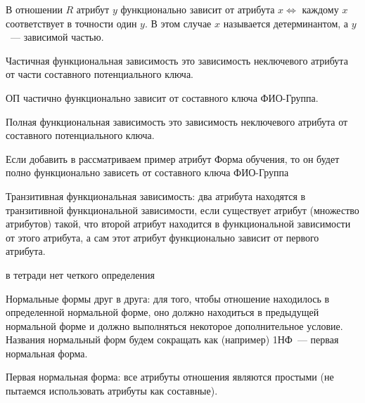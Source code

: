\begin{definition}
  В отношении \(R\) атрибут \(y\) функционально зависит от атрибута \(x \iff\)
  каждому \(x\) соответствует в точности один \(y\). В этом случае \(x\)
  называется детерминантом, а \(y\)~--- зависимой частью.
\end{definition}

\begin{definition}
  Частичная функциональная зависимость это зависимость неключевого атрибута от
  части составного потенциального ключа.
\end{definition}

\begin{example}
  ОП частично функционально зависит от составного ключа ФИО-Группа.
\end{example}

\begin{definition}
  Полная функциональная зависимость это зависимость неключевого атрибута от
  составного потенциального ключа.
\end{definition}

\begin{example}
  Если добавить в рассматриваем пример атрибут Форма обучения, то он будет полно
  функционально зависеть от составного ключа ФИО-Группа
\end{example}

\begin{definition}
  Транзитивная функциональная зависимость: два атрибута находятся в транзитивной
  функциональной зависимости, если существует атрибут (множество атрибутов)
  такой, что второй атрибут находится в функциональной зависимости от этого
  атрибута, а сам этот атрибут функционально зависит от первого атрибута.

  \todo в тетради нет четкого определения
\end{definition}


Нормальные формы  друг в друга: для того, чтобы отношение
находилось в определенной нормальной форме, оно должно находиться в предыдущей
нормальной форме и должно выполняться некоторое дополнительное условие. Названия
нормальный форм будем сокращать как (например) 1НФ~--- первая нормальная форма.

\begin{definition}
  Первая нормальная форма: все атрибуты отношения являются простыми (не пытаемся
  использовать атрибуты как составные).
\end{definition}

